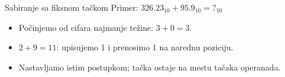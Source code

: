 \begin{frame}[label=05-s012]{Sabiranje sa fiksnom tačkom}
Primer: $326.23_{10}+95.9_{10}={?}_{10}$
\begin{center}\def\DEoper{+}\def\DErezultat{4,2,2,.,1,3}\end{center}
\begin{itemize}
\item Počinjemo od cifara najmanje težine: $3+0=3$.
\item $2+9=11$: upisujemo 1 i prenosimo 1 na narednu poziciju.
\item Nastavljamo istim postupkom; tačka ostaje na mestu tačaka operanada.
\end{itemize}
\end{frame}
